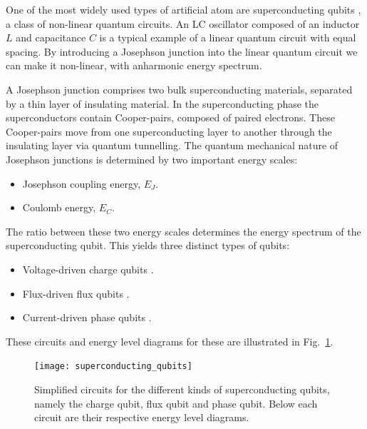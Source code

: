 One of the most widely used types of artificial atom are superconducting qubits \cite{bib:martinis1985energy, bib:shnirman1997quantum, bib:averin1998adiabatic, bib:devoret2004superconducting, bib:makhlin2001quantum}, a class of non-linear quantum circuits. An LC oscillator composed of an inductor $L$ and capacitance $C$ is a typical example of a linear quantum circuit with equal spacing. By introducing a Josephson junction into the linear quantum circuit we can make it non-linear, with anharmonic energy spectrum.

A Josephson junction \cite{bib:josephson1974the} comprises two bulk superconducting materials, separated by a thin layer of insulating material. In the superconducting phase the superconductors contain Cooper-pairs, composed of paired electrons. These Cooper-pairs move from one superconducting layer to another through the insulating layer via quantum tunnelling. The quantum mechanical nature of Josephson junctions is determined by two important energy scales:
\begin{itemize}
\item Josephson coupling energy, $E_{J}$.
\item Coulomb energy, $E_C$.
\end{itemize}
The ratio between these two energy scales determines the energy spectrum of the superconducting qubit. This yields three distinct types of qubits:
\begin{itemize}
\item Voltage-driven charge qubits \cite{bib:bouchiat1998quantum, bib:nakamura1999coherent}.
	\item Flux-driven flux qubits \cite{bib:friedman2000quantum, bib:van2000quantum}.
	\item Current-driven phase qubits \cite{bib:martinis2002rabi}.
\end{itemize} 
These circuits and energy level diagrams for these are illustrated in Fig.~\ref{fig:superconductor_circuits}.

\begin{figure}[!htbp]
\texttt{[image: superconducting\_qubits]}
\captionspacefig \caption{Simplified circuits for the different kinds of superconducting qubits, namely the charge qubit, flux qubit and phase qubit. Below each circuit are their respective energy level diagrams.}\label{fig:superconductor_circuits}
\end{figure}

